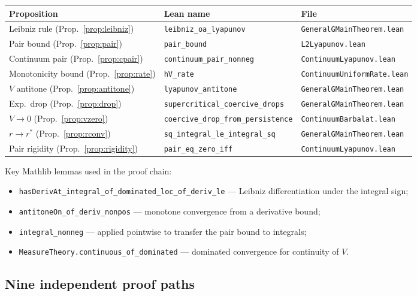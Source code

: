 \documentclass[11pt,a4paper]{article}
\theoremstyle{definition}
\begin{document}
\medskip
\begin{center}
\begin{tabular}{lll}
\textbf{Proposition} & \textbf{Lean name} & \textbf{File} \\
\hline
Leibniz rule (Prop.~\ref{prop:leibniz}) & \texttt{leibniz\_oa\_lyapunov} & \texttt{GeneralGMainTheorem.lean} \\
Pair bound (Prop.~\ref{prop:pair}) & \texttt{pair\_bound} & \texttt{L2Lyapunov.lean} \\
Continuum pair (Prop.~\ref{prop:cpair}) & \texttt{continuum\_pair\_nonneg} & \texttt{ContinuumLyapunov.lean} \\
Monotonicity bound (Prop.~\ref{prop:rate}) & \texttt{hV\_rate} & \texttt{ContinuumUniformRate.lean} \\
$V$ antitone (Prop.~\ref{prop:antitone}) & \texttt{lyapunov\_antitone} & \texttt{GeneralGMainTheorem.lean} \\
Exp.\ drop (Prop.~\ref{prop:drop}) & \texttt{supercritical\_coercive\_drops} & \texttt{GeneralGMainTheorem.lean} \\
$V \to 0$ (Prop.~\ref{prop:vzero}) & \texttt{coercive\_drop\_from\_persistence} & \texttt{ContinuumBarbalat.lean} \\
$r \to r^*$ (Prop.~\ref{prop:rconv}) & \texttt{sq\_integral\_le\_integral\_sq} & \texttt{GeneralGMainTheorem.lean} \\
Pair rigidity (Prop.~\ref{prop:rigidity}) & \texttt{pair\_eq\_zero\_iff} & \texttt{ContinuumLyapunov.lean}
\end{tabular}
\end{center}

\medskip\noindent Key Mathlib lemmas used in the proof chain:
\begin{itemize}
\item \texttt{hasDerivAt\_integral\_of\_dominated\_loc\_of\_deriv\_le} --- Leibniz differentiation under the integral sign;
\item \texttt{antitoneOn\_of\_deriv\_nonpos} --- monotone convergence from a derivative bound;
\item \texttt{integral\_nonneg} --- applied pointwise to transfer the pair bound to integrals;
\item \texttt{MeasureTheory.continuous\_of\_dominated} --- dominated convergence for continuity of $V$.
\end{itemize}

\subsection{Nine independent proof paths}
\end{document}
